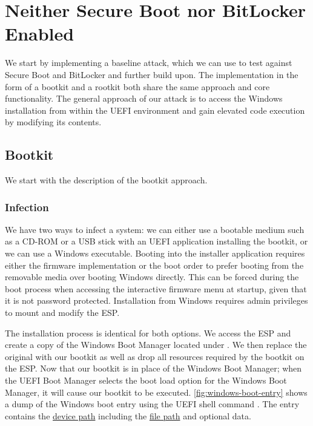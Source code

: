 
\section{Neither Secure Boot nor BitLocker Enabled}
\label{sec:attacks:neither}

We start by implementing a baseline attack, which we can use to test against Secure Boot and BitLocker and further build upon.
The implementation in the form of a bootkit and a rootkit both share the same approach and core functionality.
The general approach of our attack is to access the Windows installation from within the \ac{UEFI} environment and gain elevated code execution by modifying its contents.

\subsection{Bootkit}
\label{sec:attacks:neither:bootkit}

We start with the description of the bootkit approach.

\subsubsection{Infection}

We have two ways to infect a system: we can either use a bootable medium such as a CD-ROM or a \ac{USB} stick with an \ac{UEFI} application installing the bootkit, or we can use a Windows executable.
Booting into the installer application requires either the firmware implementation or the boot order to prefer booting from the removable media over booting Windows directly.
This can be forced during the boot process when accessing the interactive firmware menu at startup, given that it is not password protected.
Installation from Windows requires admin privileges to mount and modify the \ac{ESP}.

The installation process is identical for both options.
We access the \ac{ESP} and create a copy of the Windows Boot Manager located under .
We then replace the original with our bootkit as well as drop all resources required by the bootkit on the \ac{ESP}.
Now that our bootkit is in place of the Windows Boot Manager; when the \ac{UEFI} Boot Manager selects the boot load option for the Windows Boot Manager, it will cause our bootkit to be executed.
\autoref{fig:windows-boot-entry} shows a dump of the Windows boot entry using the \ac{UEFI} shell command .
The entry contains the \hyperref[lst:device-path-protocol]{device path} including the \hyperref[lst:device-path-protocol]{file path} and optional data.

